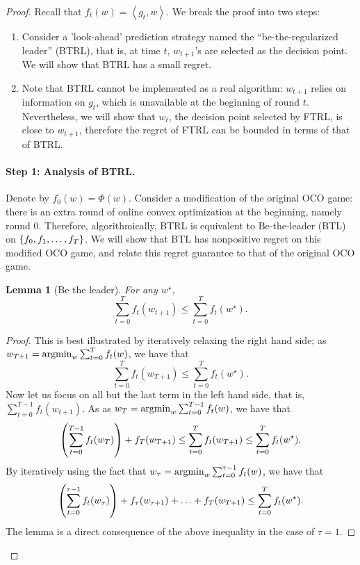 \documentclass{article}
\newtheorem{lemma}{Lemma}
\DeclareMathOperator*{\argmin}{{\rm argmin}}
\newcommand{\inner}[2]{\left\langle #1,#2 \right\rangle}
\begin{document}
\begin{proof}
Recall that $f_t(w) = \inner{g_t}{w}$. We break the proof into two steps:
\begin{enumerate}
  \item Consider a 'look-ahead' prediction strategy named the ``be-the-regularized leader'' (BTRL), that is, at time $t$, $w_{t+1}$'s are selected as the decision point. We will show that BTRL has a small regret.
  \item Note that BTRL cannot be implemented as a real algorithm: $w_{t+1}$ relies on information on $g_t$, which is unavailable at the beginning of round $t$. Nevertheless, we will show that $w_t$, the decision point selected by FTRL, is close to $w_{t+1}$, therefore the regret of FTRL can be bounded in terms of that of BTRL.
\end{enumerate}

\paragraph{Step 1: Analysis of BTRL.} Denote by $f_0(w) = \Phi(w)$. Consider a modification of the original OCO game: there is an extra round of online convex optimization at the beginning, namely round 0. Therefore, algorithmically, BTRL is equivalent to Be-the-leader (BTL) on $\cbr{f_0, f_1, \ldots, f_T}$.
We will show that BTL has nonpositive regret on this modified OCO game, and relate this regret guarantee to that of the original OCO game.
\begin{lemma}[Be the leader]
For any $w^\star$,
\[ \sum_{t=0}^T f_t(w_{t+1}) \leq \sum_{t=0}^T f_t(w^\star). \]
\label{lem:btl}
\end{lemma}
\begin{proof}
This is best illustrated by iteratively relaxing the right hand side; as $w_{T+1} = \argmin_w \sum_{t=0}^T f_t(w)$, we have that
\[ \sum_{t=0}^T f_t(w_{T+1}) \leq \sum_{t=0}^T f_t(w^\star). \]
Now let us focus on all but the last term in the left hand side, that is, $\sum_{t=0}^{T-1} f_t(w_{t+1})$. As as $w_{T} = \argmin_w \sum_{t=0}^{T-1} f_t(w)$, we have that
\[ \del{\sum_{t=0}^{T-1} f_t(w_T)} + f_T(w_{T+1}) \leq \sum_{t=0}^T f_t(w_{T+1}) \leq \sum_{t=0}^T f_t(w^\star). \]
By iteratively using the fact that $w_{\tau} = \argmin_w \sum_{t=0}^{\tau-1} f_t(w)$, we have that
\[ \del{\sum_{t=0}^{\tau-1} f_t(w_\tau)} + f_{\tau}(w_{\tau+1}) + \ldots + f_{T}(w_{T+1}) \leq \sum_{t=0}^T f_t(w^\star). \]
The lemma is a direct consequence of the above inequality in the case of $\tau = 1$.
\end{proof}


\end{proof}
\end{document}
